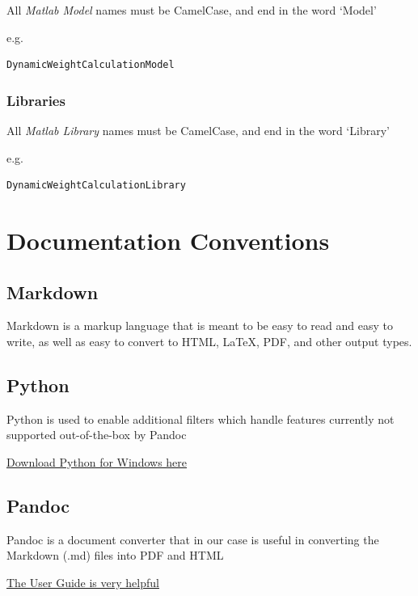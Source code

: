 \documentclass[]{book}
\begin{document}
All \emph{Matlab Model} names must be CamelCase, and end in the word
`Model'

e.g.

\begin{verbatim}
DynamicWeightCalculationModel
\end{verbatim}

\subsection{Libraries}\label{libraries-1}

All \emph{Matlab Library} names must be CamelCase, and end in the word
`Library'

e.g.

\begin{verbatim}
DynamicWeightCalculationLibrary
\end{verbatim}

\chapter{Documentation Conventions}\label{documentation-conventions}

\section{Markdown}\label{markdown}

Markdown is a markup language that is meant to be easy to read and easy
to write, as well as easy to convert to HTML, LaTeX, PDF, and other
output types.

\section{Python}\label{python}

Python is used to enable additional filters which handle features
currently not supported out-of-the-box by Pandoc

\href{https://www.python.org/downloads/windows/}{Download Python for
Windows here}

\section{Pandoc}\label{pandoc}

Pandoc is a document converter that in our case is useful in converting
the Markdown (.md) files into PDF and HTML

\href{http://pandoc.org/README.html}{The User Guide is very helpful}
\end{document}
